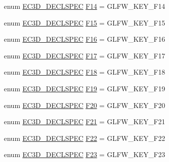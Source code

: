 \begin{DoxyCompactItemize}
\item 
enum \mbox{\hyperlink{_common_8h_aac42573e202ca3dd4d259c81691e2369}{E\+C3\+D\+\_\+\+D\+E\+C\+L\+S\+P\+EC}} \mbox{\hyperlink{classec_1_1_keyboard_aa85c5264f6d7cc445d7b8ad9ad5b9eac}{F14}} = G\+L\+F\+W\+\_\+\+K\+E\+Y\+\_\+\+F14
\item 
enum \mbox{\hyperlink{_common_8h_aac42573e202ca3dd4d259c81691e2369}{E\+C3\+D\+\_\+\+D\+E\+C\+L\+S\+P\+EC}} \mbox{\hyperlink{classec_1_1_keyboard_afdf2d1dc1df9357757c30e63a274e331}{F15}} = G\+L\+F\+W\+\_\+\+K\+E\+Y\+\_\+\+F15
\item 
enum \mbox{\hyperlink{_common_8h_aac42573e202ca3dd4d259c81691e2369}{E\+C3\+D\+\_\+\+D\+E\+C\+L\+S\+P\+EC}} \mbox{\hyperlink{classec_1_1_keyboard_aaf2f8c127d0f27fe1b6c9c13512ccffe}{F16}} = G\+L\+F\+W\+\_\+\+K\+E\+Y\+\_\+\+F16
\item 
enum \mbox{\hyperlink{_common_8h_aac42573e202ca3dd4d259c81691e2369}{E\+C3\+D\+\_\+\+D\+E\+C\+L\+S\+P\+EC}} \mbox{\hyperlink{classec_1_1_keyboard_a18122e1ed0e95e748ad31caab2ae8708}{F17}} = G\+L\+F\+W\+\_\+\+K\+E\+Y\+\_\+\+F17
\item 
enum \mbox{\hyperlink{_common_8h_aac42573e202ca3dd4d259c81691e2369}{E\+C3\+D\+\_\+\+D\+E\+C\+L\+S\+P\+EC}} \mbox{\hyperlink{classec_1_1_keyboard_ab3daea4415ff472d2b508d1b253090d2}{F18}} = G\+L\+F\+W\+\_\+\+K\+E\+Y\+\_\+\+F18
\item 
enum \mbox{\hyperlink{_common_8h_aac42573e202ca3dd4d259c81691e2369}{E\+C3\+D\+\_\+\+D\+E\+C\+L\+S\+P\+EC}} \mbox{\hyperlink{classec_1_1_keyboard_ab48cdd8c5bf4b8e47564af59678b660d}{F19}} = G\+L\+F\+W\+\_\+\+K\+E\+Y\+\_\+\+F19
\item 
enum \mbox{\hyperlink{_common_8h_aac42573e202ca3dd4d259c81691e2369}{E\+C3\+D\+\_\+\+D\+E\+C\+L\+S\+P\+EC}} \mbox{\hyperlink{classec_1_1_keyboard_ac67a6a2b6536cd6412c3c6b9dfb841e7}{F20}} = G\+L\+F\+W\+\_\+\+K\+E\+Y\+\_\+\+F20
\item 
enum \mbox{\hyperlink{_common_8h_aac42573e202ca3dd4d259c81691e2369}{E\+C3\+D\+\_\+\+D\+E\+C\+L\+S\+P\+EC}} \mbox{\hyperlink{classec_1_1_keyboard_aeaa9b7f0c5875f1d8c04ad36e1e86794}{F21}} = G\+L\+F\+W\+\_\+\+K\+E\+Y\+\_\+\+F21
\item 
enum \mbox{\hyperlink{_common_8h_aac42573e202ca3dd4d259c81691e2369}{E\+C3\+D\+\_\+\+D\+E\+C\+L\+S\+P\+EC}} \mbox{\hyperlink{classec_1_1_keyboard_af33c09fe67e20ee71d7b37c5d05c2760}{F22}} = G\+L\+F\+W\+\_\+\+K\+E\+Y\+\_\+\+F22
\item 
enum \mbox{\hyperlink{_common_8h_aac42573e202ca3dd4d259c81691e2369}{E\+C3\+D\+\_\+\+D\+E\+C\+L\+S\+P\+EC}} \mbox{\hyperlink{classec_1_1_keyboard_aaa559281a2c74941811c3d9abe55d973}{F23}} = G\+L\+F\+W\+\_\+\+K\+E\+Y\+\_\+\+F23

\end{DoxyCompactItemize}
